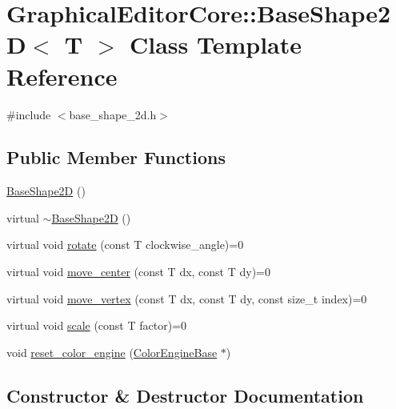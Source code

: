 \hypertarget{classGraphicalEditorCore_1_1BaseShape2D}{}\section{Graphical\+Editor\+Core\+:\+:Base\+Shape2D$<$ T $>$ Class Template Reference}
\label{classGraphicalEditorCore_1_1BaseShape2D}


{\ttfamily \#include $<$base\+\_\+shape\+\_\+2d.\+h$>$}

\subsection*{Public Member Functions}
\begin{DoxyCompactItemize}
\item 
\hyperlink{classGraphicalEditorCore_1_1BaseShape2D_aa561989871a4590bad5377fa62f13443}{Base\+Shape2D} ()
\item 
virtual \hyperlink{classGraphicalEditorCore_1_1BaseShape2D_ada8fbba63ef307fe04688007aeec4f87}{$\sim$\+Base\+Shape2D} ()
\item 
virtual void \hyperlink{classGraphicalEditorCore_1_1BaseShape2D_a94a87b2fd8485cfb7d4ca97050d1bdde}{rotate} (const T clockwise\+\_\+angle)=0
\item 
virtual void \hyperlink{classGraphicalEditorCore_1_1BaseShape2D_aab368c5a675aff41dacb23bf4cce1acb}{move\+\_\+center} (const T dx, const T dy)=0
\item 
virtual void \hyperlink{classGraphicalEditorCore_1_1BaseShape2D_a22408ae787f6e0b5444c89399173af62}{move\+\_\+vertex} (const T dx, const T dy, const size\+\_\+t index)=0
\item 
virtual void \hyperlink{classGraphicalEditorCore_1_1BaseShape2D_a2ff960ec57b180222a084642fa7dc780}{scale} (const T factor)=0
\item 
void \hyperlink{classGraphicalEditorCore_1_1BaseShape2D_a8de5ea1a542510e0800a5e4293878e0b}{reset\+\_\+color\+\_\+engine} (\hyperlink{classGraphicalEditorCore_1_1ColorEngineBase}{Color\+Engine\+Base} $\ast$)
\end{DoxyCompactItemize}


\subsection{Constructor \& Destructor Documentation}
